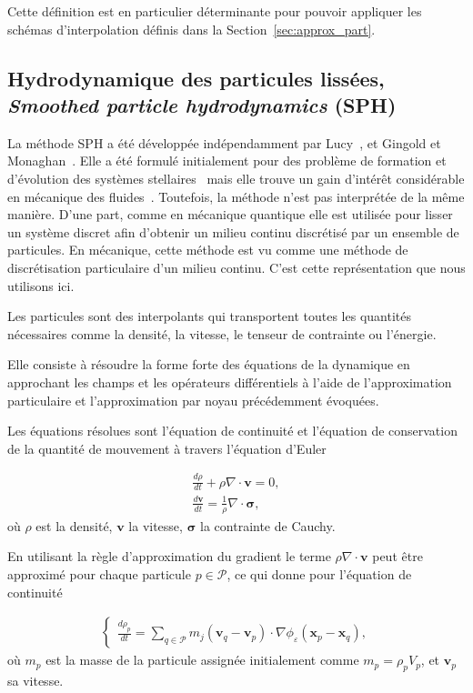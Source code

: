 Cette définition est en particulier déterminante pour pouvoir appliquer les schémas d'interpolation définis dans la Section~\ref{sec:approx_part}.

\subsection{Hydrodynamique des particules lissées, \textit{Smoothed particle hydrodynamics} (SPH)}

La méthode SPH a été développée indépendamment par Lucy~\cite{lucy_1977}, et Gingold et Monaghan~\cite{gingold_monaghan_sph_1977}. Elle a été formulé initialement pour des problème de formation et d'évolution des systèmes stellaires~\cite{hultman1999hierarchical} mais elle trouve un gain d'intérêt considérable en mécanique des fluides~\cite{PhysRevE.52.4899, SHADLOO201611}. Toutefois, la méthode n'est pas interprétée de la même manière. D'une part, comme en mécanique quantique elle est utilisée pour lisser un système discret afin d'obtenir un milieu continu discrétisé par un ensemble de particules. En mécanique, cette méthode est vu comme une méthode de discrétisation particulaire d'un milieu continu. C'est cette représentation que nous utilisons ici.

Les particules sont des interpolants qui transportent toutes les quantités nécessaires comme la densité, la vitesse, le tenseur de contrainte ou l'énergie.

Elle consiste à résoudre la forme forte des équations de la dynamique en approchant les champs et les opérateurs différentiels à l'aide de l'approximation particulaire et l'approximation par noyau précédemment évoquées.

Les équations résolues sont l'équation de continuité et l'équation de conservation de la quantité de mouvement à travers l'équation d'Euler

\begin{eqnarray*}
    \frac{d\rho}{dt} + \rho \nabla \cdot \bm{v} = 0, \\
    \frac{d\bm v}{dt} = \frac1\rho \nabla \cdot \bm \sigma,
\end{eqnarray*}où $\rho$ est la densité, $\bm v$ la vitesse, $\bm \sigma$ la contrainte de Cauchy.

En utilisant la règle d'approximation du gradient le terme $\rho \nabla \cdot \bm{v}$ peut être approximé pour chaque particule $p \in \mathcal P$, ce qui donne pour l'équation de continuité

\begin{gather*}
    \left\{\begin{aligned}
        \frac{d\rho_p}{dt} = \sum_{q \in \mathcal P} m_j (\bm v_q - \bm v_p) \cdot \nabla \phi_\varepsilon(\bm x_p - \bm x_q),
    \end{aligned}  \right.
\end{gather*}où $m_p$ est la masse de la particule assignée initialement comme $m_p = \rho_p V_p$, et $\bm v_p$ sa vitesse.

